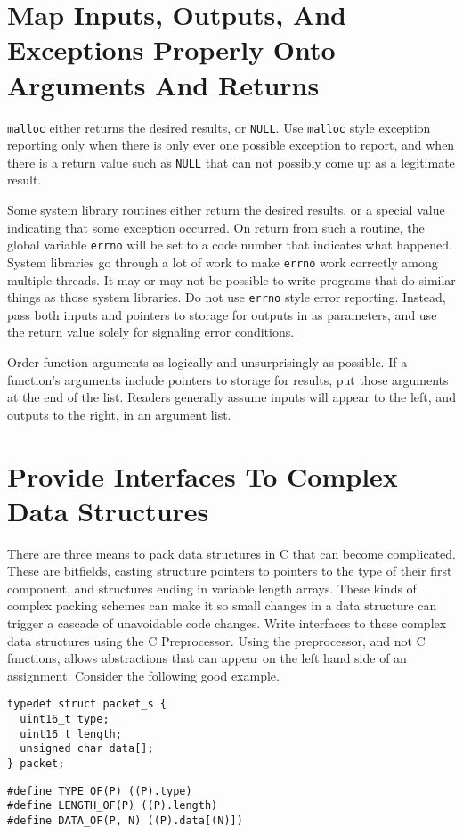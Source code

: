 \documentclass{lulu}
\newcommand{\code}[1]{\texttt{#1}\xspace}
\begin{document}
\section{Map Inputs, Outputs, And Exceptions Properly Onto Arguments And Returns}

\code{malloc} either returns the desired results, or \code{NULL}.  Use
\code{malloc} style exception reporting only when there is only ever
one possible exception to report, and when there is a return value
such as \code{NULL} that can not possibly come up as a legitimate
result.

Some system library routines either return the desired results, or a
special value indicating that some exception occurred.  On return from
such a routine, the global variable \code{errno} will be set to a code
number that indicates what happened.  System libraries go through a
lot of work to make \code{errno} work correctly among multiple
threads.  It may or may not be possible to write programs that do
similar things as those system libraries.  Do not use \code{errno}
style error reporting.  Instead, pass both inputs and pointers to
storage for outputs in as parameters, and use the return value solely
for signaling error conditions.

Order function arguments as logically and unsurprisingly as possible.
If a function's arguments include pointers to storage for results, put
those arguments at the end of the list.  Readers generally assume
inputs will appear to the left, and outputs to the right, in an
argument list.

\section{Provide Interfaces To Complex Data Structures}

There are three means to pack data structures in C that can become
complicated.  These are bitfields, casting structure pointers to
pointers to the type of their first component, and structures ending
in variable length arrays.  These kinds of complex packing schemes can
make it so small changes in a data structure can trigger a cascade of
unavoidable code changes.  Write interfaces to these complex data
structures using the C Preprocessor.  Using the preprocessor, and not
C functions, allows abstractions that can appear on the left hand side
of an assignment.  Consider the following good example.

\begin{samepage}
\begin{verbatim}
typedef struct packet_s {
  uint16_t type;
  uint16_t length;
  unsigned char data[];
} packet;
\end{verbatim}
\end{samepage}
\begin{samepage}
\begin{verbatim}
#define TYPE_OF(P) ((P).type)
#define LENGTH_OF(P) ((P).length)
#define DATA_OF(P, N) ((P).data[(N)])
\end{verbatim}
\end{samepage}
\end{document}
